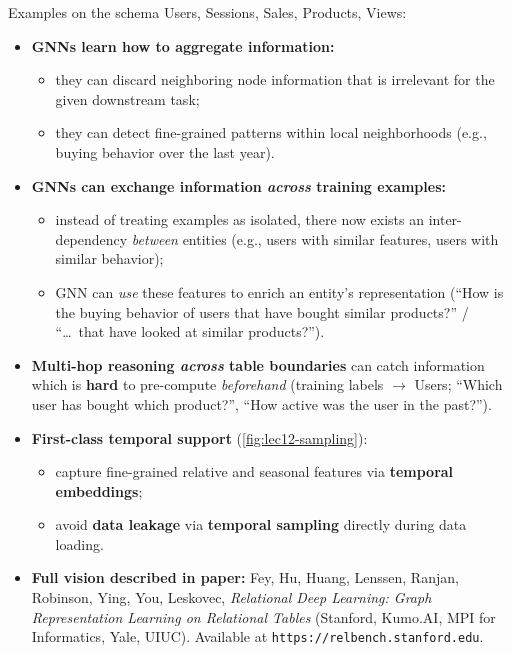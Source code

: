 Examples on the schema Users, Sessions, Sales, Products, Views:
\begin{itemize}
  \item \textbf{GNNs learn how to aggregate information:}
    \begin{itemize}
      \item they can discard neighboring node information that is irrelevant for the
        given downstream task;
      \item they can detect fine-grained patterns within local neighborhoods (e.g.,
        buying behavior over the last year).
    \end{itemize}
  \item \textbf{GNNs can exchange information \emph{across} training examples:}
    \begin{itemize}
      \item instead of treating examples as isolated, there now exists an
        inter-dependency \emph{between} entities (e.g., users with similar features, users
        with similar behavior);
      \item GNN can \emph{use} these features to enrich an entity's representation (``How
        is the buying behavior of users that have bought similar products?'' / ``\dots\
        that have looked at similar products?'').
    \end{itemize}
  \item \textbf{Multi-hop reasoning \emph{across} table boundaries} can catch information
    which is \textbf{hard} to pre-compute \emph{beforehand} (training labels $\to$ Users;
    ``Which user has bought which product?'', ``How active was the user in the past?'').
  \item \textbf{First-class temporal support} (\cref{fig:lec12-sampling}):
    \begin{itemize}
      \item capture fine-grained relative and seasonal features via \textbf{temporal
        embeddings};
      \item avoid \textbf{data leakage} via \textbf{temporal sampling} directly during
        data loading.
    \end{itemize}
  \item \textbf{Full vision described in paper:} Fey, Hu, Huang, Lenssen, Ranjan,
    Robinson, Ying, You, Leskovec, \emph{Relational Deep Learning: Graph Representation
    Learning on Relational Tables} (Stanford, Kumo.AI, MPI for Informatics, Yale, UIUC).
    Available at \texttt{https://relbench.stanford.edu}.
\end{itemize}

